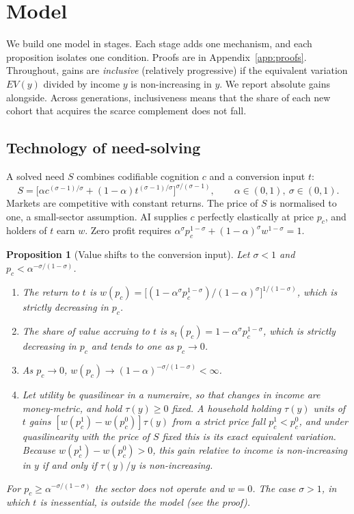 \documentclass[12pt]{article}
\newtheorem{proposition}{Proposition}
\theoremstyle{remark}
\begin{document}
\section{Model}\label{sec:model}

We build one model in stages. Each stage adds one mechanism, and each proposition isolates one condition. Proofs are in Appendix~\ref{app:proofs}. Throughout, gains are \emph{inclusive} (relatively progressive) if the equivalent variation $EV(y)$ divided by income $y$ is non-increasing in $y$. We report absolute gains alongside. Across generations, inclusiveness means that the share of each new cohort that acquires the scarce complement does not fall.

\subsection{Technology of need-solving}\label{sec:tech}

A solved need $S$ combines codifiable cognition $c$ and a conversion input $t$:
\begin{equation}
S=\big[\alpha c^{(\sigma-1)/\sigma}+(1-\alpha)t^{(\sigma-1)/\sigma}\big]^{\sigma/(\sigma-1)},\qquad \alpha\in(0,1),\ \sigma\in(0,1).
\end{equation}
Markets are competitive with constant returns. The price of $S$ is normalised to one, a small-sector assumption. AI supplies $c$ perfectly elastically at price $p_c$, and holders of $t$ earn $w$. Zero profit requires $\alpha^\sigma p_c^{1-\sigma}+(1-\alpha)^\sigma w^{1-\sigma}=1$.

\begin{proposition}[Value shifts to the conversion input]\label{prop:valueshift}
Let $\sigma<1$ and $p_c<\alpha^{-\sigma/(1-\sigma)}$.
\begin{enumerate}[label=(\roman*),itemsep=0pt]
\item The return to $t$ is $w(p_c)=\big[(1-\alpha^\sigma p_c^{1-\sigma})/(1-\alpha)^\sigma\big]^{1/(1-\sigma)}$, which is strictly decreasing in $p_c$.
\item The share of value accruing to $t$ is $s_t(p_c)=1-\alpha^\sigma p_c^{1-\sigma}$, which is strictly decreasing in $p_c$ and tends to one as $p_c\to0$.
\item As $p_c\to0$, $w(p_c)\to(1-\alpha)^{-\sigma/(1-\sigma)}<\infty$.
\item Let utility be quasilinear in a numeraire, so that changes in income are money-metric, and hold $\tau(y)\ge0$ fixed. A household holding $\tau(y)$ units of $t$ gains $[w(p_c^1)-w(p_c^0)]\tau(y)$ from a strict price fall $p_c^1<p_c^0$, and under quasilinearity with the price of $S$ fixed this is its exact equivalent variation. Because $w(p_c^1)-w(p_c^0)>0$, this gain relative to income is non-increasing in $y$ if and only if $\tau(y)/y$ is non-increasing.
\end{enumerate}
For $p_c\ge\alpha^{-\sigma/(1-\sigma)}$ the sector does not operate and $w=0$. The case $\sigma>1$, in which $t$ is inessential, is outside the model (see the proof).
\end{proposition}
\end{document}
